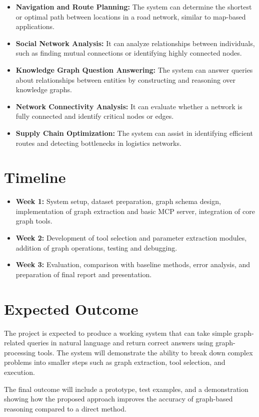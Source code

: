 \documentclass[sigconf, nonacm]{acmart}
\begin{document}
\begin{itemize}
    \item \textbf{Navigation and Route Planning:} The system can determine the shortest or optimal path between locations in a road network, similar to map-based applications.
    \item \textbf{Social Network Analysis:} It can analyze relationships between individuals, such as finding mutual connections or identifying highly connected nodes.
    \item \textbf{Knowledge Graph Question Answering:} The system can answer queries about relationships between entities by constructing and reasoning over knowledge graphs.
    \item \textbf{Network Connectivity Analysis:} It can evaluate whether a network is fully connected and identify critical nodes or edges.
    \item \textbf{Supply Chain Optimization:} The system can assist in identifying efficient routes and detecting bottlenecks in logistics networks.
\end{itemize}

\section{Timeline}
\begin{itemize}
    \item \textbf{Week 1:} System setup, dataset preparation, graph schema design, implementation of graph extraction and basic MCP server, integration of core graph tools.
    \item \textbf{Week 2:} Development of tool selection and parameter extraction modules, addition of graph operations, testing and debugging.
    \item \textbf{Week 3:} Evaluation, comparison with baseline methods, error analysis, and preparation of final report and presentation.
\end{itemize}

\section{Expected Outcome}
The project is expected to produce a working system that can take simple graph-related queries in natural language and return correct answers using graph-processing tools. The system will demonstrate the ability to break down complex problems into smaller steps such as graph extraction, tool selection, and execution.

\noindent The final outcome will include a prototype, test examples, and a demonstration showing how the proposed approach improves the accuracy of graph-based reasoning compared to a direct method.
\end{document}
